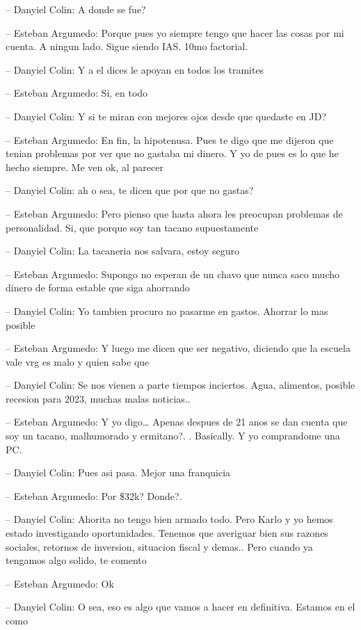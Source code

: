 -- Danyiel Colin: A donde se fue?

-- Esteban Argumedo: Porque pues yo siempre tengo que hacer las cosas
por mi cuenta. A ningun lado. Sigue siendo IAS. 10mo factorial.

-- Danyiel Colin: Y a el dices le apoyan en todos los tramites

-- Esteban Argumedo: Si, en todo

-- Danyiel Colin: Y si te miran con mejores ojos desde que quedaste en
JD?

-- Esteban Argumedo: En fin, la hipotenusa. Pues te digo que me dijeron
que tenian problemas por ver que no gastaba mi dinero. Y yo de pues es
lo que he hecho siempre. Me ven ok, al parecer

-- Danyiel Colin: ah o sea, te dicen que por que no gastas?

-- Esteban Argumedo: Pero pienso que hasta ahora les preocupan problemas
de personalidad. Si, que porque soy tan tacano supuestamente

-- Danyiel Colin: La tacaneria nos salvara, estoy seguro

-- Esteban Argumedo: Supongo no esperan de un chavo que nunca saco mucho
dinero de forma estable que siga ahorrando

-- Danyiel Colin: Yo tambien procuro no pasarme en gastos. Ahorrar lo
mas posible

-- Esteban Argumedo: Y luego me dicen que ser negativo, diciendo que la
escuela vale vrg es malo y quien sabe que

-- Danyiel Colin: Se nos vienen a parte tiempos inciertos. Agua,
alimentos, posible recesion para 2023, muchas malas noticias..

-- Esteban Argumedo: Y yo digo\ldots{} Apenas despues de 21 anos se dan
cuenta que soy un tacano, malhumorado y ermitano?. . Basically. Y yo
comprandome una PC.

-- Danyiel Colin: Pues asi pasa. Mejor una franquicia

-- Esteban Argumedo: Por \$32k? Donde?.

-- Danyiel Colin: Ahorita no tengo bien armado todo. Pero Karlo y yo
hemos estado investigando oportunidades. Tenemos que averiguar bien sus
razones sociales, retornos de inversion, situacion fiscal y demas.. Pero
cuando ya tengamos algo solido, te comento

-- Esteban Argumedo: Ok

-- Danyiel Colin: O sea, eso es algo que vamos a hacer en definitiva.
Estamos en el como

